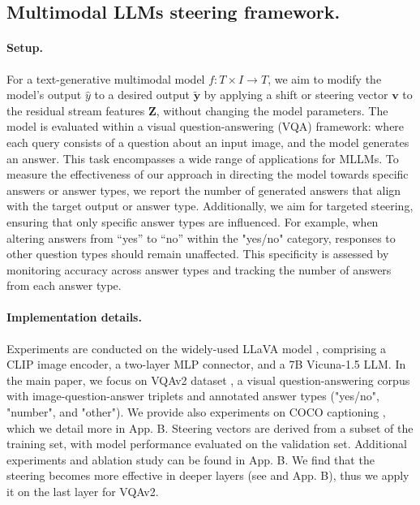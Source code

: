 \subsection{Multimodal LLMs steering framework.} 
\label{sec:model_steering_framework}

\paragraph{Setup.} For a text-generative multimodal model $f: T \times I \rightarrow T$, we aim to modify the model's output $\hat{y}$ to a desired output $\tilde{\bm{y}}$ by applying a shift or steering vector $\bm{v}$ to the residual stream features $\bm{Z}$, without changing the model parameters. The model is evaluated within a visual question-answering (VQA) framework: where each query consists of a question about an input image, and the model generates an answer. This task encompasses a wide range of applications for MLLMs. To measure the effectiveness of our approach in directing the model towards specific answers or answer types, we report the number of generated answers that align with the target output or answer type. Additionally, we aim for targeted steering, ensuring that only specific answer types are influenced. For example, when altering answers from “yes” to “no” within the "yes/no" category, responses to other question types should remain unaffected. This specificity is assessed by monitoring accuracy across answer types and tracking the number of answers from each answer type.
\paragraph{Implementation details.} Experiments are conducted on the widely-used LLaVA model \cite{liu2024improvedllava}, comprising a CLIP image encoder, a two-layer MLP connector, and a 7B Vicuna-1.5 LLM. In the main paper, we focus on VQAv2 dataset \cite{goyal2017makingvqav2}, a visual question-answering corpus with image-question-answer triplets and annotated answer types ("yes/no", "number", and "other"). We provide also experiments on COCO captioning \cite{lin2014microsoft}, which we detail more in App. B. Steering vectors are derived from a subset of the training set, with model performance evaluated on the validation set. Additional experiments and ablation study can be found in App. B. We find that the steering becomes more effective in deeper layers (see  and App. B), thus we apply it on the last layer for VQAv2.


